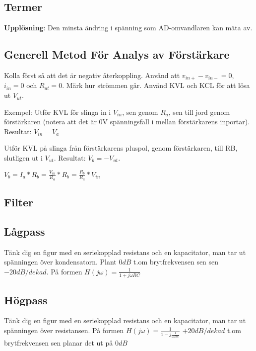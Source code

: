 \documentclass[11pt]{article}
\begin{document}
\subsection{Termer}
\textbf{Upplösning}: Den minsta ändring i spänning som AD-omvandlaren kan mäta av.

\subsection{Generell Metod För Analys av Förstärkare}
Kolla först så att det är negativ återkoppling.
Använd att $v_{in+} - v_{in-} = 0$, $i_{in} = 0$ och $R_{ut} = 0$.
Märk hur strömmen går.
Använd KVL och KCL för att lösa ut $V_{ut}$.

Exempel:
Utför KVL för slinga in i $V_{in}$, sen genom $R_{a}$, sen till jord genom förstärkaren
(notera att det är 0V spänningsfall i mellan förstärkarens inportar).
Resultat: $V_{in} = V_a$

Utför KVL på slinga från förstärkarens pluspol, genom förstärkaren, till RB, slutligen ut i $V_{ut}$.
Resultat: $V_{b} = -V_{ut}$.

$V_{b} = I_{a} * R_b = \frac{V_{in}}{R_a} * R_b = \frac{R_b}{R_a} * V_{in}$

\subsection{Filter}
\subsection{Lågpass}
Tänk dig en figur med en seriekopplad resistans och en kapacitator, man tar ut spänningen över kondensatorn.
Plant $0 dB$ t.om brytfrekvensen sen sen $-20dB/dekad$.
På formen $H(j\omega) = \frac{1}{1+j\omega RC}$

\subsection{Högpass}
Tänk dig en figur med en seriekopplad resistans och en kapacitator, man tar ut spänningen över resistansen.
På formen $H(j\omega) = \frac{1}{1-j\frac{1}{\omega RC}}$
$+20dB/dekad$ t.om brytfrekvensen sen planar det ut på $0 dB$
\end{document}
